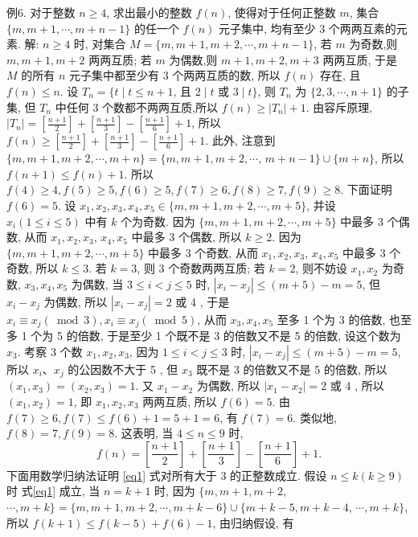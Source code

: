 例6. 对于整数 $n \geqslant 4$, 求出最小的整数 $f(n)$, 使得对于任何正整数 $m$, 集合 $\{m, m+1, \cdots, m+n-1\}$ 的任一个 $f(n)$ 元子集中, 均有至少 3 个两两互素的元素.
解: $n \geqslant 4$ 时, 对集合 $M=\{m, m+1, m+2, \cdots, m+n-1\}$, 若 $m$ 为奇数,则 $m, m+1, m+2$ 两两互质; 若 $m$ 为偶数,则 $m+1, m+2, m+3$ 两两互质, 于是 $M$ 的所有 $n$ 元子集中都至少有 3 个两两互质的数, 所以 $f(n)$ 存在, 且 $f(n) \leqslant n$.
设 $T_n=\{t \mid t \leqslant n+1$, 且 $2 \mid t$ 或 $3 \mid t\}$, 则 $T_n$ 为 $\{2,3, \cdots, n+1\}$ 的子集, 但 $T_n$ 中任何 3 个数都不两两互质,所以 $f(n) \geqslant\left|T_n\right|+1$.
由容斥原理, $\left|T_n\right|=\left[\frac{n+1}{2}\right]+\left[\frac{n+1}{3}\right]-\left[\frac{n+1}{6}\right]+1$, 所以 $f(n) \geqslant \left[\frac{n+1}{2}\right]+\left[\frac{n+1}{3}\right]-\left[\frac{n+1}{6}\right]+1$.
此外, 注意到 $\{m, m+1, m+2, \cdots, m+n\}=\{m, m+1, m+2, \cdots$, $m+n-1\} \cup\{m+n\}$, 所以 $f(n+1) \leqslant f(n)+1$.
所以 $f(4) \geqslant 4, f(5) \geqslant 5, f(6) \geqslant 5, f(7) \geqslant 6, f(8) \geqslant 7, f(9) \geqslant 8$.
下面证明 $f(6)=5$.
设 $x_1, x_2, x_3, x_4, x_5 \in\{m, m+1, m+2, \cdots, m+5\}$, 并设 $x_i(1 \leqslant i \leqslant 5)$ 中有 $k$ 个为奇数.
因为 $\{m, m+1, m+2, \cdots, m+5\}$ 中最多 3 个偶数, 从而 $x_1, x_2, x_3$, $x_4, x_5$ 中最多 3 个偶数, 所以 $k \geqslant 2$.
因为 $\{m, m+1, m+2, \cdots, m+5\}$ 中最多 3 个奇数, 从而 $x_1, x_2, x_3$, $x_4, x_5$ 中最多 3 个奇数, 所以 $k \leqslant 3$.
若 $k=3$, 则 3 个奇数两两互质;
若 $k=2$, 则不妨设 $x_1, x_2$ 为奇数, $x_3, x_4, x_5$ 为偶数, 当 $3 \leqslant i<j \leqslant 5$ 时, $\left|x_i-x_j\right| \leqslant(m+5)-m=5$, 但 $x_i-x_j$ 为偶数, 所以 $\left|x_i-x_j\right|=2$ 或 4 , 于是 $x_i \equiv x_j(\bmod 3), x_i \equiv x_j(\bmod 5)$, 从而 $x_3, x_4, x_5$ 至多 1 个为 3 的倍数,
也至多 1 个为 5 的倍数, 于是至少 1 个既不是 3 的倍数又不是 5 的倍数, 设这个数为 $x_3$.
考察 3 个数 $x_1, x_2, x_3$, 因为 $1 \leqslant i<j \leqslant 3$ 时, $\left|x_i-x_j\right| \leqslant(m+5)- m=5$, 所以 $x_i 、 x_j$ 的公因数不大于 5 , 但 $x_3$ 既不是 3 的倍数又不是 5 的倍数, 所以 $\left(x_1, x_3\right)=\left(x_2, x_3\right)=1$. 又 $x_1-x_2$ 为偶数, 所以 $\left|x_1-x_2\right|=2$ 或 4 , 所以 $\left(x_1, x_2\right)=1$, 即 $x_1, x_2, x_3$ 两两互质, 所以 $f(6)=5$.
由 $f(7) \geqslant 6, f(7) \leqslant f(6)+1=5+1=6$, 有 $f(7)=6$.
类似地, $f(8)=7, f(9)=8$.
这表明, 当 $4 \leqslant n \leqslant 9$ 时,
$$
f(n)=\left[\frac{n+1}{2}\right]+\left[\frac{n+1}{3}\right]-\left[\frac{n+1}{6}\right]+1 . \label{eq1}
$$
下面用数学归纳法证明 \ref{eq1} 式对所有大于 3 的正整数成立.
假设 $n \leqslant k(k \geqslant 9)$ 时 式\ref{eq1} 成立, 当 $n=k+1$ 时, 因为 $\{m, m+1, m+2$, $\cdots, m+k\}=\{m, m+1, m+2, \cdots, m+k-6\} \cup\{m+k-5, m+k-4$, $\cdots, m+k\}$, 所以 $f(k+1) \leqslant f(k-5)+f(6)-1$, 由归纳假设, 有
